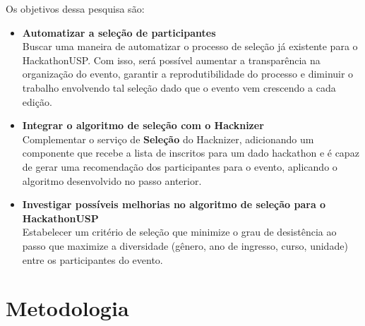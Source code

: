 \documentclass[10pt,twoside,a4paper]{article}
\begin{document}
    Os objetivos dessa pesquisa são:
    \begin{itemize}
        \item \textbf{Automatizar a seleção de participantes}\\
          Buscar uma maneira de automatizar o processo de seleção já existente para o HackathonUSP. Com isso, será possível aumentar a transparência na organização do evento, garantir a reprodutibilidade do processo e diminuir o trabalho envolvendo tal seleção dado que o evento vem crescendo a cada edição.
        
        \item \textbf{Integrar o algoritmo de seleção com o Hacknizer}\\
          Complementar o serviço de \textbf{Seleção} do Hacknizer, adicionando um componente que recebe a lista de inscritos para um dado hackathon e é capaz de gerar uma recomendação dos participantes para o evento, aplicando o algoritmo desenvolvido no passo anterior.
        
        \item \textbf{Investigar possíveis melhorias no algoritmo de seleção para o HackathonUSP}\\
          Estabelecer um critério de seleção que minimize o grau de desistência ao passo que maximize a diversidade (gênero, ano de ingresso, curso, unidade) entre os participantes do evento.
    \end{itemize}
    
    
\section{Metodologia}
      
\end{document}
